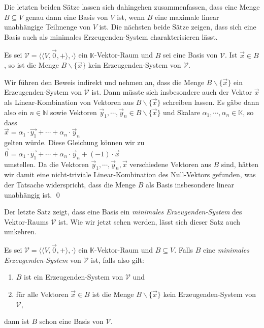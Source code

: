 Die letzten beiden S\"{a}tze lassen sich dahingehen zusammenfassen, dass eine Menge
$B \subseteq V$ genau dann eine Basis von $V$ ist, wenn $B$ eine maximale linear unabh\"{a}ngige
Teilmenge von $V$ ist.  Die n\"{a}chsten beide S\"{a}tze zeigen, dass sich eine Basis auch als minimales
Erzeugenden-System charakterisieren l\"{a}sst.

\begin{Satz}
  Es sei $\mathcal{V} = \bigl\langle \langle V, \vec{0}, + \rangle, \cdot \bigr\rangle$ ein
  $\mathbb{K}$-Vektor-Raum und $B$ sei eine Basis von $\mathcal{V}$.  Ist $\vec{x} \in B$,
  so ist die Menge $B \backslash \{ \vec{x} \}$ kein Erzeugenden-System von $\mathcal{V}$.
\end{Satz}

\proof
Wir f\"{u}hren den Beweis indirekt und nehmen an, dass die Menge $B \backslash \{ \vec{x} \}$ ein 
Erzeugenden-System von $\mathcal{V}$ ist.  Dann m\"{u}sste sich insbesondere auch der Vektor $\vec{x}$ als
Linear-Kombination von Vektoren aus  $B \backslash \{ \vec{x} \}$ schreiben lassen.  Es g\"{a}be dann
also ein $n \in \mathbb{N}$ sowie Vektoren  $\vec{y}_1, \cdots, \vec{y}_n \in B\backslash \{\vec{x}\}$ und Skalare 
$\alpha_1, \cdots, \alpha_n \in \mathbb{K}$, so dass
\\[0.2cm]
\hspace*{1.3cm}
$\vec{x} = \alpha_1 \cdot \vec{y_1} + \cdots + \alpha_n \cdot \vec{y}_n$
\\[0.2cm]
gelten w\"{u}rde.  Diese Gleichung k\"{o}nnen wir zu
\\[0.2cm]
\hspace*{1.3cm}
$\vec{0} =  \alpha_1 \cdot \vec{y_1} + \cdots + \alpha_n \cdot \vec{y}_n + (-1) \cdot \vec{x}$
\\[0.2cm]
umstellen.  Da die Vektoren $\vec{y}_1, \cdots, \vec{y}_n, \vec{x}$ verschiedene Vektoren aus $B$ sind,
h\"{a}tten wir damit eine nicht-triviale Linear-Kombination des Null-Vektors gefunden, was der Tatsache
widerspricht, dass die Menge $B$ als Basis insbesondere linear unabh\"{a}ngig ist. \qed

Der letzte Satz zeigt, dass eine Basis ein \emph{minimales Erzeugenden-System} des Vektor-Raums $\mathcal{V}$
ist.  Wie wir jetzt sehen werden, l\"{a}sst sich dieser Satz auch umkehren.

\begin{Satz}
  Es sei $\mathcal{V} = \bigl\langle \langle V, \vec{0}, + \rangle, \cdot \bigr\rangle$ ein $\mathbb{K}$-Vektor-Raum 
  und $B \subseteq V$.  Falls $B$ eine \emph{minimales Erzeugenden-System}
  von $\mathcal{V}$ ist, falls also gilt:
  \begin{enumerate}
  \item $B$ ist ein Erzeugenden-System von $\mathcal{V}$ und
  \item f\"{u}r alle Vektoren $\vec{x} \in B$ ist die Menge $B \backslash \{ \vec{x} \}$
        kein Erzeugenden-System von $\mathcal{V}$,
  \end{enumerate}
  dann ist $B$ schon eine Basis von $\mathcal{V}$.
\end{Satz}

